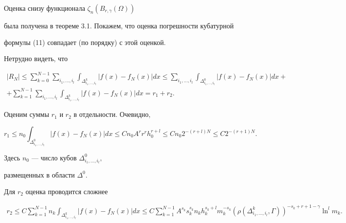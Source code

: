 \begin{pf} Оценка снизу функционала $\zeta_n (B_{r,\gamma}(\Omega))$


была получена в теореме 3.1. Покажем, что оценка погрешности кубатурной


формулы (11) совпадает (по порядку) с этой оценкой.





Нетрудно видеть, что


\begin{multline*}


| R_N| \le \sum_{k=0}^{N-1}


\sum_{i_1,\dotsc,i_l}\int_{\Delta^k_{i_1,\dotsc,i_l}}


| f(x)-f_N(x)| dx \le


\sum_{i_1,\dotsc,i_l}\int_{\Delta^0_{i_1,\dotsc,i_l}}


| f(x)-f_N(x)| dx+ \\


+\sum_{k=1}^{N-1}\sum_{i_1,\dotsc,i_l}\int_{\Delta^k_


{i_1,\dotsc,i_l}} | f(x)-f_N(x)| dx = r_1+r_2.


\end{multline*}


Оценим суммы $ r_1 $ и $ r_2 $ в отдельности. Очевидно,


$$


r_1 \le n_0 \int_{\Delta^0_{i_1,\dotsc,i_l}}


| f(x)-f_N(x)| dx \le Cn_0 A^rr^r h_0^{r+l} \le


Cn_0 2^{-(r+l)N} \le C2^{-(r+1)N}.


$$


Здесь $n_0$ --- число кубов $\Delta^0_{i_1,\dotsc,i_l},$


размещенных в области $\Delta^0.$


Для $ r_2 $ оценка проводится сложнее


\begin{multline*}


r_2 \le C\sum_{k=1}^{N-1} n_k\int_


{\Delta^k_{i_1,\dotsc,i_l}}| f(x)-f_N(x)| dx


\le


C\sum_{k=1}^{N-1}A^{s_k}s_k^{s_k} n_k h_k^{s_k+l}m_k^{-s_k}


(\rho(\Delta^k_{i_1,\dotsc,i_l},\Gamma))^{-s_k+r+1-\gamma }\ln^l m_k.


\end{multline*}



\end{pf}
